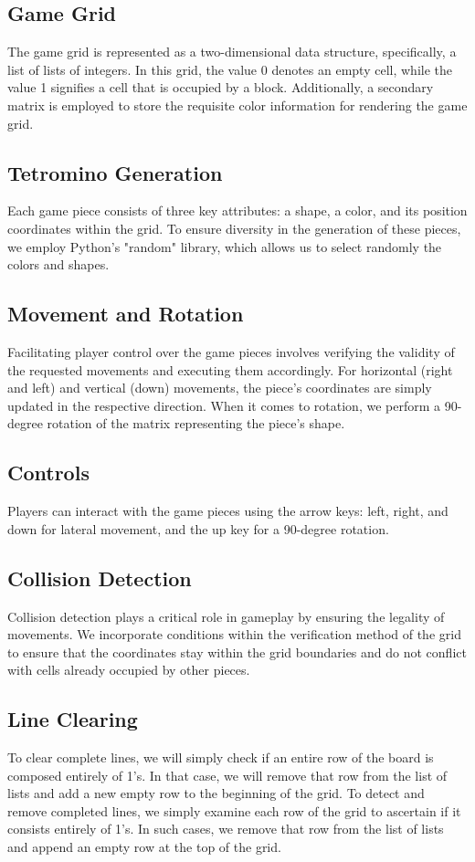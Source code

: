 \documentclass[conference]{IEEEtran}
\begin{document}
\subsection{Game Grid}
The game grid is represented as a two-dimensional data structure, specifically, a list of lists of integers. In this grid, the value 0 denotes an empty cell, while the value 1 signifies a cell that is occupied by a block. Additionally, a secondary matrix is employed to store the requisite color information for rendering the game grid.
\subsection{Tetromino Generation}
Each game piece consists of three key attributes: a shape, a color, and its position coordinates within the grid. To ensure diversity in the generation of these pieces, we employ Python's "random"\cite{b6} library, which allows us to select randomly the colors and shapes.
\subsection{Movement and Rotation}
Facilitating player control over the game pieces involves verifying the validity of the requested movements and executing them accordingly. For horizontal (right and left) and vertical (down) movements, the piece's coordinates are simply updated in the respective direction. When it comes to rotation, we perform a 90-degree rotation of the matrix representing the piece's shape.
\subsection{Controls}
Players can interact with the game pieces using the arrow keys: left, right, and down for lateral movement, and the up key for a 90-degree rotation.
\subsection{Collision Detection}
Collision detection plays a critical role in gameplay by ensuring the legality of movements. We incorporate conditions within the verification method of the grid to ensure that the coordinates stay within the grid boundaries and do not conflict with cells already occupied by other pieces.
\subsection{Line Clearing}
To clear complete lines, we will simply check if an entire row of the board is composed entirely of 1's. In that case, we will remove that row from the list of lists and add a new empty row to the beginning of the grid.
To detect and remove completed lines, we simply examine each row of the grid to ascertain if it consists entirely of 1's. In such cases, we remove that row from the list of lists and append an empty row at the top of the grid.
\end{document}
